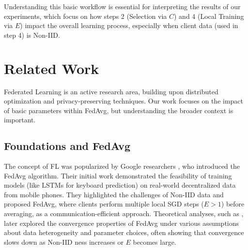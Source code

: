 \documentclass[conference]{IEEEtran}
\begin{document}
Understanding this basic workflow is essential for interpreting the results of our experiments, which focus on how steps 2 (Selection via $C$) and 4 (Local Training via $E$) impact the overall learning process, especially when client data (used in step 4) is Non-IID.


\section{Related Work}
Federated Learning is an active research area, building upon distributed optimization and privacy-preserving techniques. Our work focuses on the impact of basic parameters within FedAvg, but understanding the broader context is important.

\subsection{Foundations and FedAvg}
The concept of FL was popularized by Google researchers \cite{b2, b5}, who introduced the FedAvg algorithm. Their initial work demonstrated the feasibility of training models (like LSTMs for keyboard prediction) on real-world decentralized data from mobile phones. They highlighted the challenges of Non-IID data and proposed FedAvg, where clients perform multiple local SGD steps ($E>1$) before averaging, as a communication-efficient approach. Theoretical analyses, such as \cite{b18}, later explored the convergence properties of FedAvg under various assumptions about data heterogeneity and parameter choices, often showing that convergence slows down as Non-IID ness increases or $E$ becomes large.
\end{document}

